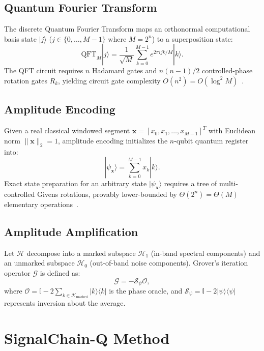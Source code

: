 \documentclass[journal,compsoc]{IEEEtran}
\begin{document}
\subsection{Quantum Fourier Transform}
The discrete Quantum Fourier Transform maps an orthonormal computational basis state $|j\rangle$ ($j \in \{0, \dots, M-1\}$ where $M=2^n$) to a superposition state:
\begin{equation}
\text{QFT}_M |j\rangle = \frac{1}{\sqrt{M}} \sum_{k=0}^{M-1} e^{2\pi i j k / M} |k\rangle.
\end{equation}
The QFT circuit requires $n$ Hadamard gates and $n(n-1)/2$ controlled-phase rotation gates $R_k$, yielding circuit gate complexity $O(n^2) = O(\log^2 M)$~\cite{nielsenchuang2010}.

\subsection{Amplitude Encoding}
Given a real classical windowed segment $\mathbf{x} = [x_0, x_1, \dots, x_{M-1}]^T$ with Euclidean norm $\|\mathbf{x}\|_2 = 1$, amplitude encoding initializes the $n$-qubit quantum register into:
\begin{equation}
|\psi_{\mathbf{x}}\rangle = \sum_{k=0}^{M-1} x_k |k\rangle.
\end{equation}
Exact state preparation for an arbitrary state $|\psi_{\mathbf{x}}\rangle$ requires a tree of multi-controlled Givens rotations, provably lower-bounded by $\Theta(2^n) = \Theta(M)$ elementary operations~\cite{shende2006synthesis}.

\subsection{Amplitude Amplification}
Let $\mathcal{H}$ decompose into a marked subspace $\mathcal{H}_1$ (in-band spectral components) and an unmarked subspace $\mathcal{H}_0$ (out-of-band noise components). Grover's iteration operator $\mathcal{G}$ is defined as:
\begin{equation}
\mathcal{G} = - \mathcal{S}_{\psi} \mathcal{O},
\end{equation}
where $\mathcal{O} = \mathbb{I} - 2\sum_{k \in \mathcal{K}_{\text{marked}}} |k\rangle\langle k|$ is the phase oracle, and $\mathcal{S}_{\psi} = \mathbb{I} - 2|\psi\rangle\langle\psi|$ represents inversion about the average.

\section{SignalChain-Q Method}
\end{document}
